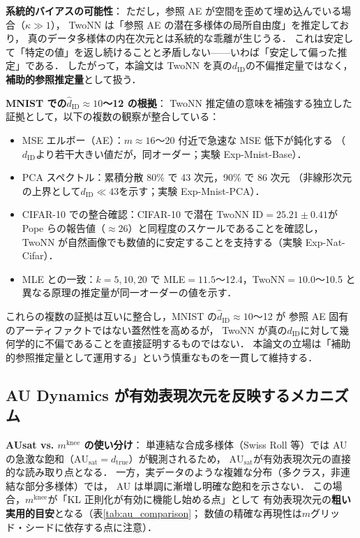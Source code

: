 \documentclass[11pt,a4paper]{jsarticle}
\newcommand{\dtrue}{d_{\mathrm{true}}}
\newcommand{\AUsat}{\mathrm{AU}_{\mathrm{sat}}}
\newcommand{\mknee}{m^{\mathrm{knee}}}
\begin{document}
\textbf{系統的バイアスの可能性}：
ただし，参照 AE が空間を歪めて埋め込んでいる場合（$\kappa \gg 1$），
TwoNN は「参照 AE の潜在多様体の局所自由度」を推定しており，
真のデータ多様体の内在次元とは系統的な乖離が生じうる．
これは安定して「特定の値」を返し続けることと矛盾しない——いわば「安定して偏った推定」である．
したがって，本論文は TwoNN を真の$d_\mathrm{ID}$の不偏推定量ではなく，
\textbf{補助的参照推定量}として扱う．

\textbf{MNIST での$\hat{d}_\mathrm{ID} \approx 10$〜12 の根拠}：
TwoNN 推定値の意味を補強する独立した証拠として，以下の複数の観察が整合している：
\begin{itemize}
  \item MSE エルボー（AE）：$m \approx 16$〜20 付近で急速な MSE 低下が鈍化する
        （$d_\mathrm{ID}$より若干大きい値だが，同オーダー；実験 Exp-Mnist-Base）．
  \item PCA スペクトル：累積分散 80\% で 43 次元，90\% で 86 次元
        （非線形次元の上界として$d_\mathrm{ID} \ll 43$を示す；実験 Exp-Mnist-PCA）．
  \item CIFAR-10 での整合確認：CIFAR-10 で潜在 TwoNN ID$=25.21\pm0.41$が
        Pope ら\cite{pope2021intrinsic}の報告値（$\approx26$）と同程度のスケールであることを確認し，
        TwoNN が自然画像でも数値的に安定することを支持する（実験 Exp-Nat-Cifar）．
  \item MLE との一致：$k=5,10,20$ で MLE$=11.5$〜12.4，TwoNN$=10.0$〜10.5 と
        異なる原理の推定量が同一オーダーの値を示す．
\end{itemize}
これらの複数の証拠は互いに整合し，MNIST の$\hat{d}_\mathrm{ID} \approx 10$〜12 が
参照 AE 固有のアーティファクトではない蓋然性を高めるが，
TwoNN が真の$d_\mathrm{ID}$に対して幾何学的に不偏であることを直接証明するものではない．
本論文の立場は「補助的参照推定量として運用する」という慎重なものを一貫して維持する．

\subsection{AU Dynamics が有効表現次元を反映するメカニズム}\label{sec:disc_au_dynamics}

\textbf{AUsat vs. $\mknee$ の使い分け}：
単連結な合成多様体（Swiss Roll 等）では AU の急激な飽和（$\AUsat = \dtrue$）が観測されるため，
$\AUsat$が有効表現次元の直接的な読み取り点となる．
一方，実データのような複雑な分布（多クラス，非連結な部分多様体）では，
AU は単調に漸増し明確な飽和を示さない．
この場合，$\mknee$が「KL 正則化が有効に機能し始める点」として
有効表現次元の\textbf{粗い実用的目安}となる（表\ref{tab:au_comparison}；
数値の精確な再現性は$m$グリッド・シードに依存する点に注意）．
\end{document}
